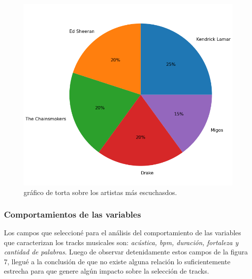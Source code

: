 \documentclass{article}
\begin{document}
\begin{figure}[h]
  \centering
  \includegraphics[scale=0.4]{f}
  \caption{gráfico de torta sobre los artistas más escuchasdos.}
\end{figure}

\newpage
\subsubsection{Comportamientos de las variables}
Los campos que seleccioné para el análisis del comportamiento de las variables
que caracterizan los tracks musicales son:
\textit{acústica, bpm, duración, fortaleza y cantidad de palabras}. Luego de
observar detenidamente estos campos de la figura 7, llegué a la conclusión de
que no existe alguna relación lo suficientemente estrecha para que genere algún
impacto sobre la selección de tracks.
\end{document}
